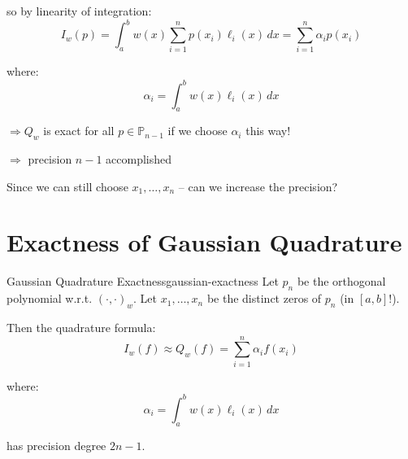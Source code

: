 so by linearity of integration:
\[I_w(p) = \int_a^b w(x) \sum_{i=1}^n p(x_i) \ell_i(x) \, dx = \sum_{i=1}^n \alpha_i p(x_i)\]

where:
\[\alpha_i = \int_a^b w(x) \ell_i(x) \, dx\]

$\Rightarrow Q_w$ is exact for all $p \in \mathbb{P}_{n-1}$ if we choose $\alpha_i$ this way!

$\Rightarrow$ precision $n-1$ accomplished

Since we can still choose $x_1, \ldots, x_n$ – can we increase the precision?

\section{Exactness of Gaussian Quadrature}

\begin{theorem}{Gaussian Quadrature Exactness}{gaussian-exactness}
    Let $p_n$ be the orthogonal polynomial w.r.t. $(\cdot, \cdot)_w$. Let $x_1, \ldots, x_n$ be the distinct zeros of $p_n$ (in $[a,b]$!).

    Then the quadrature formula:
    \[I_w(f) \approx Q_w(f) = \sum_{i=1}^n \alpha_i f(x_i)\]

    where:
    \[\alpha_i = \int_a^b w(x) \ell_i(x) \, dx\]

    has precision degree $2n-1$.
\end{theorem}

